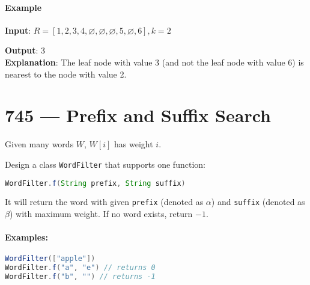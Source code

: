 \documentclass[a4paper,12pt]{article}
\begin{document}
\paragraph*{Example}
\begin{flushleft}
\textbf{Input}: $R = [1,2,3,4,\varnothing,\varnothing,\varnothing,5,\varnothing,6], k = 2$
\begin{figure}[H]
\end{figure}
\textbf{Output}: 3
\\
\textbf{Explanation}: The leaf node with value 3 (and not the leaf node with value 6) is nearest to the node with value 2.
\end{flushleft}

\section{745 --- Prefix and Suffix Search}
Given many words $W$, $W[i]$ has weight $i$.
\par
Design a class \texttt{WordFilter} that supports one function:
\begin{lstlisting}[backgroundcolor=\color{blue!80!green!10}, keywordstyle=\bfseries\color{green!40!black}, commentstyle=\itshape\color{purple!40!black},language=Java]
WordFilter.f(String prefix, String suffix)
\end{lstlisting}
It will return the word with given \texttt{prefix} (denoted as $\alpha$) and \texttt{suffix} (denoted as $\beta$) with maximum weight. If no word exists, return $-1$.
\paragraph{Examples:}
\begin{flushleft}
\begin{lstlisting}[backgroundcolor=\color{blue!80!green!10}, keywordstyle=\bfseries\color{green!40!black}, commentstyle=\itshape\color{purple!40!black},language=Java]
WordFilter(["apple"])
WordFilter.f("a", "e") // returns 0
WordFilter.f("b", "") // returns -1
\end{lstlisting}
\end{flushleft}
\end{document}
